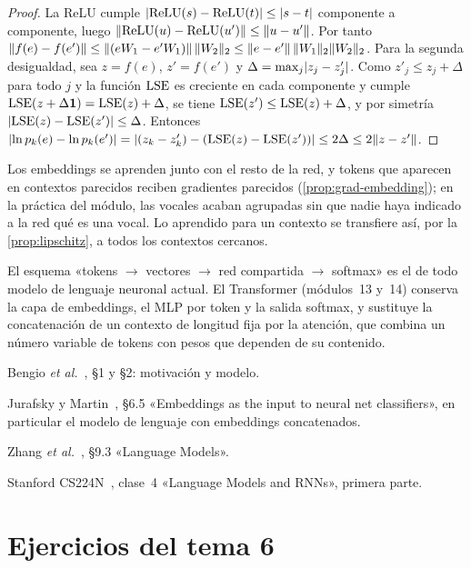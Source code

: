 \begin{proof}
La ReLU cumple $\lvert\operatorname{ReLU}(s)-\operatorname{ReLU}(t)\rvert\le\lvert s-t\rvert$ componente a componente, luego $\lVert\operatorname{ReLU}(u)-\operatorname{ReLU}(u')\rVert\le\lVert u-u'\rVert$. Por tanto $\lVert f(e)-f(e')\rVert\le\lVert(eW_1-e'W_1)\rVert\,\lVert W_2\rVert_2\le\lVert e-e'\rVert\,\lVert W_1\rVert_2\lVert W_2\rVert_2$. Para la segunda desigualdad, sea $z=f(e)$, $z'=f(e')$ y $\Delta=\max_j\lvert z_j-z'_j\rvert$. Como $z'_j\le z_j+\Delta$ para todo $j$ y la función $\operatorname{LSE}$ es creciente en cada componente y cumple $\operatorname{LSE}(z+\Delta\mathbf{1})=\operatorname{LSE}(z)+\Delta$, se tiene $\operatorname{LSE}(z')\le\operatorname{LSE}(z)+\Delta$, y por simetría $\lvert\operatorname{LSE}(z)-\operatorname{LSE}(z')\rvert\le\Delta$. Entonces $\lvert\ln p_k(e)-\ln p_k(e')\rvert=\lvert(z_k-z'_k)-(\operatorname{LSE}(z)-\operatorname{LSE}(z'))\rvert\le 2\Delta\le 2\lVert z-z'\rVert$.
\end{proof}

Los embeddings se aprenden junto con el resto de la red, y tokens que aparecen en contextos parecidos reciben gradientes parecidos (\cref{prop:grad-embedding}); en la práctica del módulo, las vocales acaban agrupadas sin que nadie haya indicado a la red qué es una vocal. Lo aprendido para un contexto se transfiere así, por la \cref{prop:lipschitz}, a todos los contextos cercanos.

\begin{observacion}
El esquema «tokens $\to$ vectores $\to$ red compartida $\to$ softmax» es el de todo modelo de lenguaje neuronal actual. El Transformer (módulos~13 y~14) conserva la capa de embeddings, el MLP por token y la salida softmax, y sustituye la concatenación de un contexto de longitud fija por la atención, que combina un número variable de tokens con pesos que dependen de su contenido.
\end{observacion}

\begin{lecturas}
\item Bengio \emph{et al.}~\cite{bengio}, §1 y §2: motivación y modelo.
\item Jurafsky y Martin~\cite{jm3}, §6.5 «Embeddings as the input to neural net classifiers», en particular el modelo de lenguaje con embeddings concatenados.
\item Zhang \emph{et al.}~\cite{d2l}, §9.3 «Language Models».
\item Stanford CS224N~\cite{cs224n}, clase~4 «Language Models and RNNs», primera parte.
\end{lecturas}

\section*{Ejercicios del tema 6}

